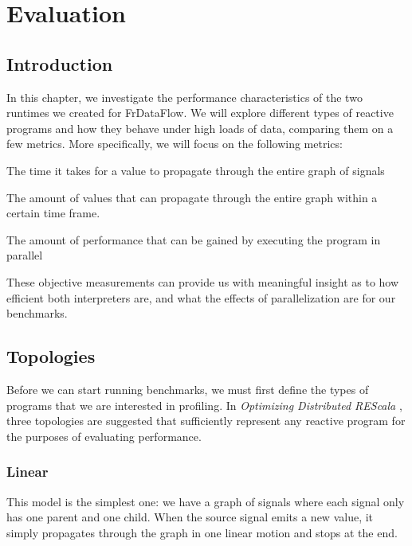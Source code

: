 \chapter{Evaluation}

\section{Introduction}

In this chapter, we investigate the performance characteristics of the two runtimes we created for FrDataFlow. We will explore different types of reactive programs and how they behave under high loads of data, comparing them on a few metrics. More specifically, we will focus on the following metrics:

\begin{description}[style=nextline]
  \item [Latency]		The time it takes for a value to propagate through the entire graph of signals
  \item [Throughput]	The amount of values that can propagate through the entire graph within a certain time frame.
  \item [Scaling]		The amount of performance that can be gained by executing the program in parallel
\end{description}

These objective measurements can provide us with meaningful insight as to how efficient both interpreters are, and what the effects of parallelization are for our benchmarks.

\newpage
\section{Topologies}

Before we can start running benchmarks, we must first define the types of programs that we are interested in profiling. In \textit{Optimizing Distributed REScala} \cite{drechsler_optimizing_2014}, three topologies are suggested that sufficiently represent any reactive program for the purposes of evaluating performance.

\subsection{Linear}

This model is the simplest one: we have a graph of signals where each signal only has one parent and one child. When the source signal emits a new value, it simply propagates through the graph in one linear motion and stops at the end. 

